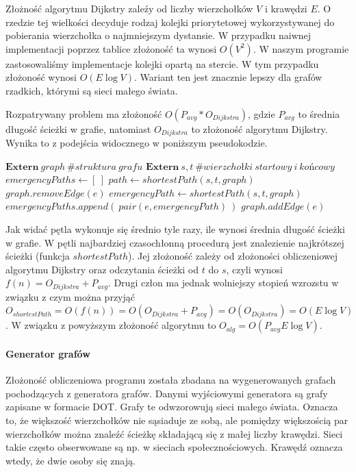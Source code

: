 \documentclass[a4paper, 12pt]{article}
\begin{document}
Złożność algorytmu Dijkstry zaleźy od liczby wierzchołków $V$ i krawędzi $E$. O rzedzie tej wielkości decyduje rodzaj kolejki priorytetowej wykorzystywanej do pobierania wierzchołka o najmniejszym dystansie. W przypadku naiwnej implementacji poprzez tablice złożoność ta wynosi $O(V^2)$. W naszym programie zastosowaliśmy implementacje kolejki opartą na stercie. W tym przypadku złożoność wynosi $O(E \log V)$. Wariant ten jest znacznie lepszy dla grafów rzadkich, którymi są sieci małego świata.

Rozpatrywany problem ma złożoność $O(P_{avg}*O_{Dijkstra})$, gdzie $P_{avg}$ to średnia długość ścieżki w grafie, natomiast $O_{Dijkstra}$ to złożoność algorytmu Dijkstry. Wynika to z podejścia widocznego w poniższym pseudokodzie.
\begin{algorithmic}
\State $\mathbf{Extern}\ graph\ \mathit{\# struktura\ grafu}$
\State $\mathbf{Extern}\ s, t\ \mathit{\# wierzchołki\ startowy\ i\ końcowy}$
\State
\State $emergencyPaths \gets [\ ]$
 \State $path \gets shortestPath(s, t, graph)$
\State $graph.removeEdge(e)$
\State $emergencyPath \gets shortestPath(s, t, graph)$
\State $emergencyPaths.append(\ pair(e, emergencyPath)\ )$
\State $graph.addEdge(e)$
\EndFor
\State {}
\end{algorithmic}
Jak widać pętla wykonuje się średnio tyle razy, ile wynosi średnia długość ścieżki w grafie. W pętli najbardziej czasochłonną procedurą jest znalezienie najkrótszej ścieżki (funkcja $shortestPath$). Jej złożoność zależy od złożoności obliczeniowej algorytmu Dijkstry oraz odczytania ścieżki od $t$ do $s$, czyli wynosi $f(n) = O_{Dijkstra}+ P_{avg}$. Drugi człon ma jednak wolniejszy stopień wzrozstu w związku z czym można przyjąć $O_{shortestPath}=O(f(n))=O(O_{Dijkstra}+ P_{avg}) = O(O_{Dijkstra}) = O(E \log V)$.
W związku z powyższym złożoność algorytmu to $O_{alg} = O( P_{avg}E \log V)$.

\paragraph{Generator grafów}
\label{generator}
Złożoność obliczeniowa programu została zbadana na wygenerowanych grafach pochodzących z generatora grafów. Danymi wyjściowymi generatora są grafy zapisane w formacie DOT. Grafy te odwzorowują sieci małego świata\cite{amaral2000classes}. Oznacza to, że większość wierzchołków nie sąsiaduje ze sobą, ale pomiędzy większością par wierzchołków można znaleźć ścieżkę składającą się z małej liczby krawędzi. Sieci takie często obserwowane są np. w sieciach społecznościowych. Krawędź oznacza wtedy, że dwie osoby się znają.
\end{document}
